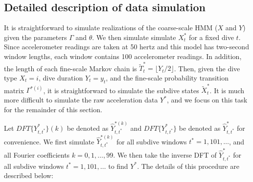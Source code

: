 
\subsection{Detailed description of data simulation}

It is straightforward to simulate realizations of the coarse-scale HMM ($X$ and $Y$) given the parameters $\Gamma$ and $\theta$. We then simulate simulate $X^*_t$ for a fixed dive $t$. Since accelerometer readings are taken at 50 hertz and this model has two-second window lengths, each window contains 100 accelerometer readings. In addition, the length of each fine-scale Markov chain is $\tilde{T}^*_t = \lfloor Y_t/2 \rfloor$. Then, given the dive type $X_t = i$, dive duration $Y_t = y_t$, and the fine-scale probability transition matrix $\Gamma^{*(i)}$, it is straightforward to simulate the subdive states $\tilde{X}^*_t$. It is much more difficult to simulate the raw acceleration data $Y^*$, and we focus on this task for the remainder of this section. 

Let $DFT\{Y^*_{t,t^*}\}(k)$ be denoted as $\hat{Y}^{*(k)}_{t,t^*}$ and $DFT\{Y^*_{t,t^*}\}$ be denoted as $\hat{Y}^*_{t,t^*}$ for convenience. We first simulate $\hat Y^{*(k)}_{t,t^*}$ for all subdive windows $t^* = 1,101,\ldots$, and all Fourier coefficients $k = 0,1,\ldots,99$. We then take the inverse DFT of $\hat{Y}^*_{t,t^*}$ for all subdive windows $t^* = 1,101,\ldots$ to find $Y^*$. The details of this procedure are described below:

